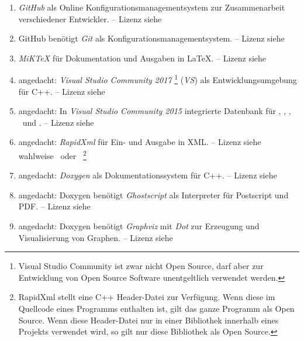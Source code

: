\begin{enumerate}
	\setcounter{enumi}{\value{Enumi}}%

	\item\label{Werkzeug:GitHub}\emph{GitHub} als Online Konfigurationsmanagementsystem zur Zusammenarbeit verschiedener Entwickler.
	-- Lizenz siehe~\cite{bib:GPLii}

	\item\label{Werkzeug:Git}GitHub benötigt \emph{Git} als Konfigurationsmanagementsystem.
	-- Lizenz siehe~\cite{bib:GPLii}

	\item\label{Werkzeug:MiKTeX}\emph{MiK\TeX} für Dokumentation und Ausgaben in \LaTeX.
	-- Lizenz siehe~\cite{bib:MiKTeX}

	\item\label{Werkzeug:VSC}angedacht: \emph{Visual Studio Community 2017}%
	\footnote{%
		Visual Studio Community ist zwar nicht Open Source, darf aber zur Entwicklung von Open Source Software
		unentgeltlich verwendet werden.
	}
	(\emph{VS}) als Entwicklungsumgebung für C++.
	-- Lizenz siehe~\cite{bib:EULA}

	\item\label{Werkzeug:VSC DB}angedacht: In \emph{Visual Studio Community 2015} integrierte Datenbank für \Ausgabeschemata, \Saetze, \Beweise, \Fachbegriffe\ und \Fachgebiete.
	-- Lizenz siehe~\cite{bib:EULA}

	\item\label{Werkzeug:RapidXml}angedacht: \emph{RapidXml} für Ein- und Ausgabe in XML.
	-- Lizenz siehe wahlweise~\cite{bib:BSLi} oder~\cite{bib:MIT}
	\footnote{%
		RapidXml stellt eine C++ Header-Datei zur Verfügung.
		Wenn diese im Quellcode eines Programms enthalten ist, gilt das ganze Programm als Open Source.
		Wenn diese Header-Datei nur in einer Bibliothek innerhalb eines Projekts verwendet wird, so gilt nur diese Bibliothek als Open Source.
	}

	\item\label{Werkzeug:Doxygen}angedacht: \emph{Doxygen} als Dokumentationssystem für C++.
	-- Lizenz siehe~\cite{bib:GPLii}

	\item\label{Werkzeug:Ghostscript}angedacht: Doxygen benötigt \emph{Ghostscript} als Interpreter für Postscript und PDF.
	-- Lizenz siehe~\cite{bib:AGPL}

	\item\label{Werkzeug:Graphviz}angedacht: Doxygen benötigt \emph{Graphviz} mit \emph{Dot} zur Erzeugung und Visualisierung von Graphen.
	-- Lizenz siehe~\cite{bib:EPL}

	\setcounter{Enumi}{\value{enumi}}%
\end{enumerate}

